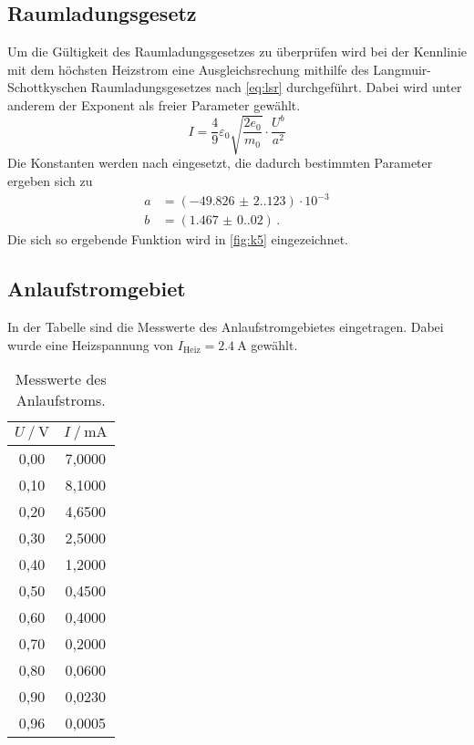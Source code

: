 \subsection{Raumladungsgesetz}

Um die Gültigkeit des Raumladungsgesetzes zu überprüfen wird bei der Kennlinie mit
dem höchsten Heizstrom eine Ausgleichsrechung mithilfe des Langmuir-Schottkyschen
Raumladungsgesetzes nach \autoref{eq:lsr} durchgeführt. 
Dabei wird unter anderem der Exponent als freier Parameter gewählt.
\begin{equation*}
  I= \frac{4}{9} \varepsilon_{0} \sqrt{\frac{2 e_{0}}{m_{0}}} \cdot \frac{U^{b}}{a^2}
\end{equation*}
Die Konstanten werden nach \cite{constants} eingesetzt, die dadurch bestimmten Parameter ergeben sich zu
\begin{align*}
  a &= (\num{-49.826(2.123)}) \cdot 10^{-3} \\
  b &= (\num{1.467(0.020)}) \, . 
\end{align*}
Die sich so ergebende Funktion wird in \autoref{fig:k5} eingezeichnet.


\subsection{Anlaufstromgebiet}

In der Tabelle sind die Messwerte des Anlaufstromgebietes eingetragen. Dabei wurde
eine Heizspannung von $I_{\text{Heiz}} = \qty{2.4}{\ampere}$ gewählt.
\begin{table}
  \centering
  \caption{Messwerte des Anlaufstroms.}
  \label{tab:anlaufstrom}
  \begin{tabular}{c c}
    \toprule
    $U \mathbin{/} \unit{\volt}$ &
    $I \mathbin{/} \unit{\milli\ampere}$ \\
    \midrule
    0,00 & 7,0000 \\
    0,10 & 8,1000 \\
    0,20 & 4,6500 \\
    0,30 & 2,5000 \\
    0,40 & 1,2000 \\
    0,50 & 0,4500 \\
    0,60 & 0,4000 \\
    0,70 & 0,2000 \\
    0,80 & 0,0600 \\
    0,90 & 0,0230 \\
    0,96 & 0,0005 \\
    \bottomrule
  \end{tabular}
\end{table}

